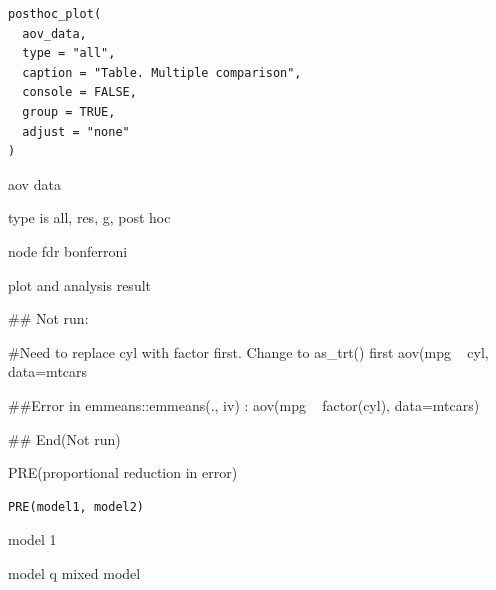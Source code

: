 \documentclass[a4paper]{book}
\begin{document}
%
\begin{Usage}
\begin{verbatim}
posthoc_plot(
  aov_data,
  type = "all",
  caption = "Table. Multiple comparison",
  console = FALSE,
  group = TRUE,
  adjust = "none"
)
\end{verbatim}
\end{Usage}
%
\begin{Arguments}
\begin{ldescription}
\item[\code{aov\_data}] aov data

\item[\code{type}] type is all, res, g, post hoc

\item[\code{adjust}] node fdr bonferroni
\end{ldescription}
\end{Arguments}
%
\begin{Value}
plot and analysis result
\end{Value}
%
\begin{Examples}
\begin{ExampleCode}

## Not run: 

#Need to replace cyl with factor first. Change to as_trt() first
aov(mpg ~ cyl, data=mtcars %

##Error in emmeans::emmeans(., iv) :
aov(mpg ~ factor(cyl), data=mtcars)%


## End(Not run)

\end{ExampleCode}
\end{Examples}
%
\begin{Description}
PRE(proportional reduction in error)
\end{Description}
%
\begin{Usage}
\begin{verbatim}
PRE(model1, model2)
\end{verbatim}
\end{Usage}
%
\begin{Arguments}
\begin{ldescription}
\item[\code{model1}] model 1

\item[\code{model2}] model q mixed model
\end{ldescription}
\end{Arguments}
\end{document}
